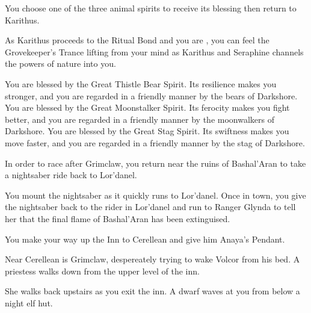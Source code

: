 
You choose one of the three animal spirits to receive its blessing then return to Karithus.


As Karithus proceeds to the Ritual Bond and you are , you can feel the Grovekeeper's Trance lifting from your mind as Karithus and Seraphine channels the powers of nature into you.


 You are blessed by the Great Thistle Bear Spirit. Its resilience makes you stronger, and you are regarded in a friendly manner by the bears of Darkshore.
 You are blessed by the Great Moonstalker Spirit. Its ferocity makes you fight better, and you are regarded in a friendly manner by the moonwalkers of Darkshore.
 You are blessed by the Great Stag Spirit. Its swiftness makes you move faster, and you are regarded in a friendly manner by the stag of Darkshore.


In order to race after Grimclaw, you return near the ruins of Bashal'Aran to take a nightsaber ride back to Lor'danel.


You mount the nightsaber as it quickly runs to Lor'danel. Once in town, you give the nightsaber back to the rider in Lor'danel and run to Ranger Glynda to tell her that the final flame of Bashal'Aran has been extinguised.


You make your way up the Inn to Cerellean and give him Anaya's Pendant.


Near Cerellean is Grimclaw, despereately trying to wake Volcor from his bed. A priestess walks down from the upper level of the inn.


She walks back upstairs as you exit the inn. A dwarf waves at you from below a night elf hut.


